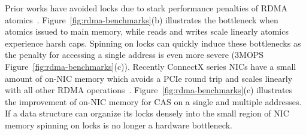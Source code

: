 
Prior works have avoided locks due to stark performance penalties of RDMA
atomics~\cite{design-guidelines}.  Figure~\ref{fig:rdma-benchmarks}(b) illustrates the bottleneck
when atomics issued to main memory, while reads and writes scale linearly atomics experience harsh
caps. Spinning on locks can quickly induce these bottlenecks as the penalty for accessing a single
address is even more severe (3MOPS Figure~\ref{fig:rdma-benchmarks}(c)). Recently ConnectX series
NICs have a small amount of on-NIC memory which avoids a PCIe round trip and scales linearly with
all other RDMA operations~\cite{sherman,device-memory}. Figure~\ref{fig:rdma-benchmarks}(c)
illustrates the improvement of on-NIC memory for CAS on a single and multiple addresses. If a data
structure can organize its locks densely into the small region of NIC memory spinning on locks is no
longer a hardware bottleneck.



